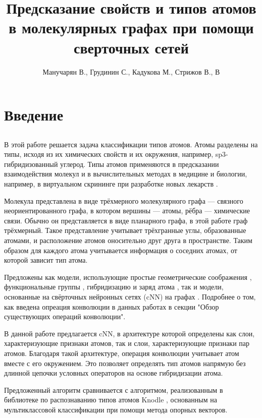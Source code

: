 \documentclass[12pt,twoside]{article}
\title
    [] %
    {Предсказание свойств и типов атомов в молекулярных графах при помощи сверточных сетей}
\author
    [] %
    {Манучарян В., Грудинин С., Кадукова М., Стрижов В., В} %
    [Манучарян В., Грудинин С., Кадукова М., Стрижов В., В] %
\begin{document}
\maketitle
\section{Введение}
\subsection{}
	В этой работе решается задача классификации типов атомов. Атомы разделены на типы, исходя из их химических свойств и их окружения, например, sp3-гибридизованный углерод. Типы атомов применяются в предсказании взаимодействия молекул и в вычислительных методах в медицине и биологии, например, в виртуальном скрининге при разработке новых лекарств \cite{article2}.
	
	Молекула представлена в виде трёхмерного молекулярного графа --- связного неориентированного графа, в котором вершины --- атомы, рёбра --- химические связи. Обычно он представляется в виде планарного графа, в этой работе граф трёхмерный. Такое представление учитывает трёхгранные углы, образованные атомами, и расположение атомов оносительно друг друга в пространстве. Таким образом для каждого атома учитывается информация о соседних атомах, от которой зависит тип атома.
	
	Предложены как модели, использующие простые геометрические соображения \cite{article3}, функциональные группы \cite{article4}, гибридизацию и заряд атома \cite{article5,article6,article7,article8}, так и модели, основанные на свёрточных нейронных сетях (cNN) на графах \cite{article15,article16,article20}. Подробнее о том, как введена опреация конволюции в данных работах в секции "Обзор существующих операций конволюции".
	
	В данной работе предлагается cNN, в архитектуре которой определены как слои, характеризующие признаки атомов, так и слои, характеризующие признаки пар атомов. Благодаря такой архитектуре, операция конволюции учитывает атом вместе с его окружением. Это позволяет определять тип атомов напрямую без длинной цепочки условных операторов на основе гибридизации атома.
	
	Предложенный алгоритм сравнивается с алгоритмом, реализованным в библиотеке по распознаванию типов атомов Knodle \cite{article1}, основанным на мультиклассовой классификации при помощи метода опорных векторов.
	
\end{document}
